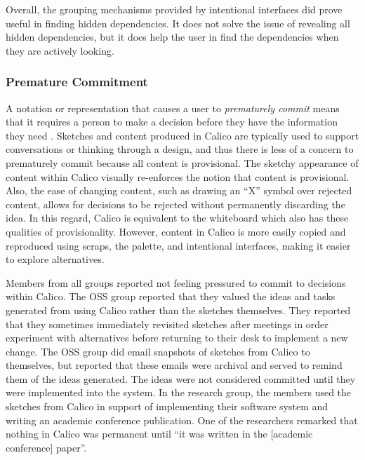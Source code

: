 Overall, the grouping mechanisms provided by intentional interfaces did prove useful in finding hidden dependencies. It does not solve the issue of revealing all hidden dependencies, but it does help the user in find the dependencies when they are actively looking.

%


\subsubsection{Premature Commitment}
A notation or representation that causes a user to \textit{prematurely commit} means that it requires a person to make a decision before they have the information they need \cite{Petre2013BookChapter}. Sketches and content produced in Calico are typically used to support conversations or thinking through a design, and thus there is less of a concern to prematurely commit because all content is provisional. The sketchy appearance of content within Calico visually re-enforces the notion that content is provisional. Also, the ease of changing content, such as drawing an ``X'' symbol over rejected content, allows for decisions to be rejected without permanently discarding the idea. In this regard, Calico is equivalent to the whiteboard which also has these qualities of provisionality. However, content in Calico is more easily copied and reproduced using scraps, the palette, and intentional interfaces, making it easier to explore alternatives.

Members from all groups reported not feeling pressured to commit to decisions within Calico. The OSS group reported that they valued the ideas and tasks generated from using Calico rather than the sketches themselves. They reported that they sometimes immediately revisited sketches after meetings in order experiment with alternatives before returning to their desk to implement a new change. The OSS group did email snapshots of sketches from Calico to themselves, but reported that these emails were archival and served to remind them of the ideas generated. The ideas were not considered committed until they were implemented into the system. In the research group, the members used the sketches from Calico in support of implementing their software system and writing an academic conference publication. One of the researchers remarked that nothing in Calico was permanent until ``it was written in the [academic conference] paper''. 

